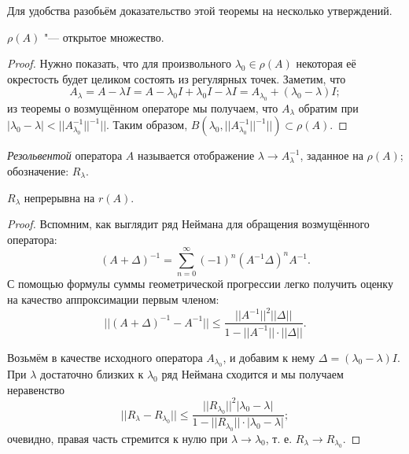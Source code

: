 \documentclass[main]{subfiles}
\begin{document}
Для удобства разобьём доказательство
этой теоремы на несколько утверждений.


\setcounter{proposition}{-1}
\begin{proposition} %
  \( \rho(A) \) "--- открытое множество.
\end{proposition}
\begin{proof}
  Нужно показать, что для произвольного
  \( \lambda_0 \in \rho(A) \) некоторая её
  окрестость будет целиком состоять
  из регулярных точек.
  Заметим, что
  \[
    A_\lambda = A - \lambda I =
    A - \lambda_0 I + \lambda_0 I - \lambda I =
    A_{\lambda_0} + (\lambda_0 - \lambda) I;
  \]
  из теоремы о возмущённом операторе мы получаем,
  что \( A_\lambda \) обратим при
  \( |\lambda_0 - \lambda| < ||A_{\lambda_0}^{-1}||^{-1}|| \).
  Таким образом,
  \( B(\lambda_0, ||A_{\lambda_0}^{-1}||^{-1}||) \subset \rho(A) \).
\end{proof}

%

\begin{definition}
  \emph{Резольвентой} оператора \( A \) называется
  отображение \( \lambda \to A_\lambda^{-1} \),
  заданное на \( \rho(A) \); обозначение: \( R_\lambda \).
\end{definition}

\begin{proposition} %
  \( R_\lambda \) непрерывна на \( r(A) \).
\end{proposition}
\begin{proof}
  Вспомним, как выглядит ряд Неймана
  для обращения возмущённого оператора:
  \[
    (A + \Delta)^{-1} = \sum_{n=0}^\infty (-1)^n (A^{-1} \Delta)^n A^{-1}.
  \]
  С помощью формулы суммы геометрической прогрессии
  легко получить оценку на качество аппроксимации первым членом:
  \[
    ||(A + \Delta)^{-1} - A^{-1}|| \le \frac{||A^{-1}||^2 ||\Delta||}
    {1 - ||A^{-1}|| \cdot ||\Delta||}.
  \]

  Возьмём в качестве исходного оператора \( A_{\lambda_0} \),
  и добавим к нему \( \Delta = (\lambda_0 - \lambda) I \).
  При \( \lambda \) достаточно близких к \( \lambda_0 \)
  ряд Неймана сходится и мы получаем неравенство
  \[
    ||R_\lambda - R_{\lambda_0}|| \le
    \frac{||R_{\lambda_0}||^2 |\lambda_0 - \lambda|}
    {1 - ||R_{\lambda_0}|| \cdot |\lambda_0 - \lambda|};
  \]
  очевидно, правая часть стремится к нулю при
  \( \lambda \to \lambda_0 \), т. е.
  \( R_\lambda \to R_{\lambda_0} \).
\end{proof}
\end{document}
